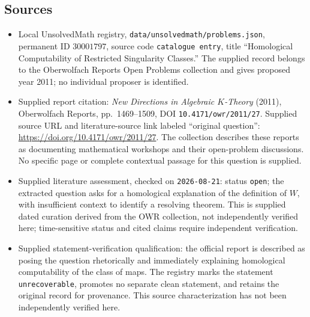 \documentclass[11pt]{article}
\begin{document}
\subsection{Sources}
\begin{itemize}
\item Local UnsolvedMath registry, \texttt{data/unsolvedmath/problems.json}, permanent ID \(30001797\), source code \texttt{catalogue entry}, title ``Homological Computability of Restricted Singularity Classes.'' The supplied record belongs to the Oberwolfach Reports Open Problems collection and gives proposed year 2011; no individual proposer is identified.
\item Supplied report citation: \emph{New Directions in Algebraic \(K\)-Theory} (2011), Oberwolfach Reports, pp.~1469--1509, DOI \texttt{10.4171/owr/2011/27}. Supplied source URL and literature-source link labeled ``original question'': \url{https://doi.org/10.4171/owr/2011/27}. The collection describes these reports as documenting mathematical workshops and their open-problem discussions. No specific page or complete contextual passage for this question is supplied.
\item Supplied literature assessment, checked on \texttt{2026-08-21}: status \texttt{open}; the extracted question asks for a homological explanation of the definition of \(W\), with insufficient context to identify a resolving theorem. This is supplied dated curation derived from the OWR collection, not independently verified here; time-sensitive status and cited claims require independent verification.
\item Supplied statement-verification qualification: the official report is described as posing the question rhetorically and immediately explaining homological computability of the class of maps. The registry marks the statement \texttt{unrecoverable}, promotes no separate clean statement, and retains the original record for provenance. This source characterization has not been independently verified here.
\end{itemize}
\end{document}
